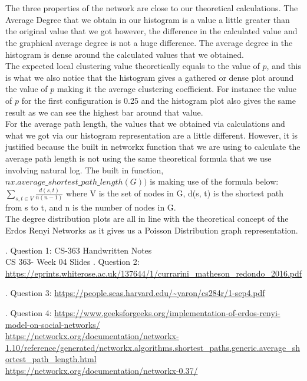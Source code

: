 \documentclass[answers]{exam}
\begin{document}
\begin{questions}
\begin{framed}
\\\\The three properties of the network are close to our theoretical calculations. The Average Degree that we obtain in our histogram is a value a little greater than the original value that we got however, the difference in the calculated value and the graphical average degree is not a huge difference. The average degree in the histogram is dense around the calculated values that we obtained.\\


The expected local clustering value theoretically equals to the value of $p$, and this is what we also notice that the histogram gives a gathered or dense plot around the value of $p$ making it the average clustering coefficient. For instance the value of $p$ for the first configuration is 0.25 and the histogram plot also gives the same result as we can see the highest bar around that value.\\
For the average path length, the values that we obtained via calculations and what we got via our histogram representation are a little different. However, it is justified  because the built in networkx function that we are using to calculate the average path length is not using the same theoretical formula that we use involving natural log. The built in function, $nx.average\_shortest\_path\_length(G))$ is making use of the formula below:\\ $\sum_{s,t \in V} 
\frac{d(s,t)}{n(n-1)}$ where V is the set of nodes in G, d(s, t) is the shortest path from s to t, and n is the number of nodes in G. \\The degree distribution plots are all in line with the theoretical concept of the Erdos Renyi Networks as it gives us a Poisson Distribution graph representation. 
\end{framed}

\end{questions}
\begin{thebibliography}{9}
\bibitem   . Question 1: CS-363 Handwritten Notes \\CS 363- Week 04 Slides 
\bibitem   . Question 2: \url{https://eprints.whiterose.ac.uk/137644/1/currarini_matheson_redondo_2016.pdf}

\bibitem   . Question 3:
\url{https://people.seas.harvard.edu/~yaron/cs284r/1-sep4.pdf}

\bibitem   . Question 4:
\url{https://www.geeksforgeeks.org/implementation-of-erdos-renyi-model-on-social-networks/}\\
\url{https://networkx.org/documentation/networkx-1.10/reference/generated/networkx.algorithms.shortest_paths.generic.average_shortest_path_length.html}\\ \url{https://networkx.org/documentation/networkx-0.37/}



  \end{thebibliography}
  
\end{document}

